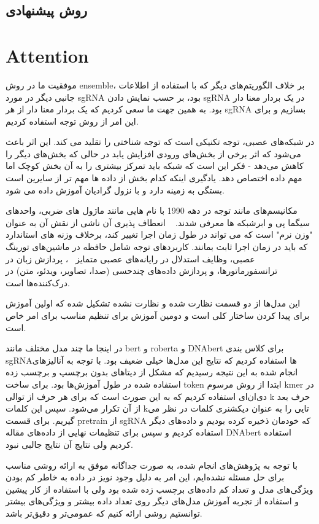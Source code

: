 \documentclass[12pt,a4paper,BCOR=.7cm,headsepline,bibliography=totoc]{report}
\begin{document}
\subsection{روش پیشنهادی}
\section{Attention}
موفقیت ما در روش ensemble، بر خلاف الگوریتم‌های دیگر که با استفاده از اطلاعات جانبی دیگر در مورد sgRNA بود، بر حسب نمایش دادن sgRNA در یک بردار معنا دار بود. به همین جهت ما سعی کردیم که یک بردار معنا دار از هر ‌sgRNA بسازیم و برای این امر از روش توجه استفاده کردیم.

در شبکه‌های عصبی، توجه تکنیکی است که توجه شناختی را تقلید می کند. این اثر باعث می‌شود که اثر برخی از بخش‌های ورودی افزایش یابد در حالی که بخش‌های دیگر را کاهش می‌دهد - فکر این است که شبکه باید تمرکز بیشتری را به آن بخش کوچک اما مهم داده اختصاص دهد. یادگیری اینکه کدام بخش از داده ها مهم تر از سایرین است بستگی به زمینه دارد و با نزول گرادیان آموزش داده می شود.

مکانیسم‌های مانند توجه در دهه 1990 با نام هایی مانند ماژول های ضربی، واحدهای سیگما پی و ابرشبکه ها معرفی شدند. ~\cite{Yann} انعطاف پذیری آن ناشی از نقش آن به عنوان "وزن نرم" است که می تواند در طول زمان اجرا تغییر کند، برخلاف وزنه های استاندارد که باید در زمان اجرا ثابت بمانند. کاربردهای توجه شامل حافظه در ماشین‌های تورینگ عصبی، وظایف استدلال در رایانه‌های عصبی متمایز ~\cite{Hybrid}، پردازش زبان در ترانسفورماتورها، و پردازش داده‌های چندحسی (صدا، تصاویر، ویدئو، متن) در درک‌کننده‌ها است.~\cite{Vaswani, Ramachandran, Jaegle, Ray} 	

این مدل‌ها از دو قسمت نظارت شده و  نظارت نشده تشکیل شده که اولین آموزش برای پیدا کردن ساختار کلی است و دومین آموزش برای تنظیم مناسب برای امر خاص است.

در اینجا ما چند مدل مختلف مانند bert و roberta و DNAbert برای کلاس بندی sgRNAها استفاده کردیم که نتایج این مدل‌ها خیلی ضعیف بود. با توجه به آنالیزهای انجام شده به این نتیجه رسیدیم که مشکل از دیتاهای بدون برچسپ و برچسب زده استفاده شده در طول آموزش‌ها بود. برای ساخت token ابتدا از روش مرسوم kmer در دی‌ان‌ای استفاده کردیم که به این صورت است که برای هر حرف از توالی k حرف بعد از آن تکرار می‌شود. سپس این کلمات kتایی را به عنوان دیکشنری کلمات در نظر می گیریم. برای قسمت pretrain از sgRNA که خودمان ذخیره کرده بودیم و داده‌های دیگر استفاده کردیم و سپس برای تنظیمات نهایی از داده‌های مقاله DNAbert استفاده کردیم ولی نتایج آن نتایج جالبی نبود.

با توجه به پژوهش‌های انجام شده، به صورت جداگانه موفق به ارائه روشی مناسب برای حل مسئله نشده‌ایم، این امر به دلیل وجود نویز در داده به خاطر کم بودن ویژگی‌های مدل و تعداد کم داده‌های برچسب زده شده بود ولی با استفاده از کار پیشین و استفاده از تجربه آموزش مدل‌های دیگر روی تعداد داده بیشتر و ویژگی‌های بیشتر توانستیم روشی ارائه کنیم که عمومی‌تر و دقیق‌تر باشد.
\end{document}
